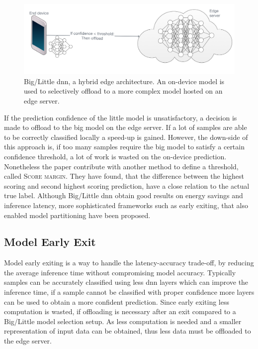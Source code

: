 \begin{figure}
	\centering
	\includegraphics[width=\linewidth]{figures/models/big_little_dnn}
	\caption[Big/Little \gls{dnn} architecture]{Big/Little \gls{dnn}, a hybrid edge architecture. An on-device model is used to selectively offload to a more complex model hosted on an edge server.}
	\label{fig:big/little-dnn}
\end{figure}

If the prediction confidence of the little model is unsatisfactory, a decision is made to offload to the big model on the edge server. If a lot of samples are able to be correctly classified locally a speed-up is gained. However, the down-side of this approach is, if too many samples require the big model to satisfy a certain confidence threshold, a lot of work is wasted on the on-device prediction. Nonetheless the paper \cite{park_big/little_2015} contribute with another method to define a threshold, called \textsc{Score margin}. They have found, that the difference between the highest scoring and second highest scoring prediction, have a close relation to the actual true label. Although Big/Little \gls{dnn} obtain good results on energy savings and inference latency, more sophisticated frameworks such as early exiting, that also enabled model partitioning have been proposed.

\subsection{Model Early Exit}

Model early exiting is a way to handle the latency-accuracy trade-off, by reducing the average inference time without compromising model accuracy. Typically samples can be accurately classified using less \gls{dnn} layers which can improve the inference time, if a sample cannot be classified with proper confidence more layers can be used to obtain a more confident prediction. Since early exiting less computation is wasted, if offloading is necessary after an exit compared to a Big/Little model selection setup. As less computation is needed and a smaller representation of input data can be obtained, thus less data must be offloaded to the edge server.

